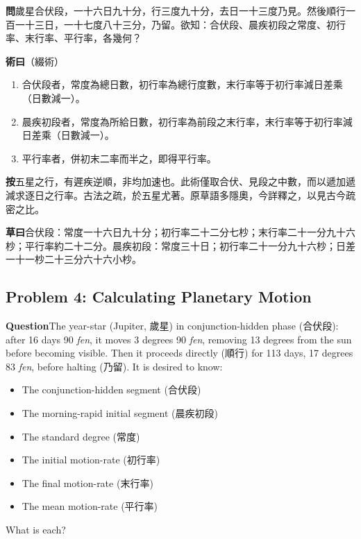 \documentclass[11pt,a4paper]{article}
\newcommand{\WenCN}{\textbf{\color{headcolor}問}}
\newcommand{\ShuCN}{\textbf{\color{headcolor}術曰}}
\newcommand{\CaoCN}{\textbf{\color{headcolor}草曰}}
\newcommand{\AnCN}{\textbf{\color{headcolor}按}}
\newcommand{\WenEN}{\textbf{\color{headcolor}Question}}
\begin{document}
\vspace{0.5em}
\WenCN{}\quad 歲星合伏段，一十六日九十分，行三度九十分，去日一十三度乃見。然後順行一百一十三日，一十七度八十三分，乃留。欲知：合伏段、晨疾初段之常度、初行率、末行率、平行率，各幾何？

\vspace{0.5em}
\ShuCN{}\quad（綴術）
\begin{enumerate}[noitemsep,topsep=0pt]
  \item 合伏段者，常度為總日數，初行率為總行度數，末行率等于初行率減日差乘（日數減一）。
  \item 晨疾初段者，常度為所給日數，初行率為前段之末行率，末行率等于初行率減日差乘（日數減一）。
  \item 平行率者，併初末二率而半之，即得平行率。
\end{enumerate}

\vspace{0.5em}
\AnCN{}\quad 五星之行，有遲疾逆順，非均加速也。此術僅取合伏、見段之中數，而以遞加遞減求逐日之行率。古法之疏，於五星尤著。原草語多隱奧，今詳釋之，以見古今疏密之比。

\vspace{0.5em}
\CaoCN{}\quad 合伏段：常度一十六日九十分；初行率二十二分七杪；末行率二十一分九十六杪；平行率約二十二分。晨疾初段：常度三十日；初行率二十一分九十六杪；日差一十一杪二十三分六十六小杪。

\switchcolumn[1]
\subsection*{Problem 4: Calculating Planetary Motion}
\label{sec:zhuishutuixing}

\vspace{0.5em}
\WenEN{}\quad The year-star (Jupiter, 歲星) in conjunction-hidden phase (合伏段): after 16 days 90 \textit{fen}, it moves 3 degrees 90 \textit{fen}, removing 13 degrees from the sun before becoming visible. Then it proceeds directly (順行) for 113 days, 17 degrees 83 \textit{fen}, before halting (乃留). It is desired to know:
\begin{itemize}[noitemsep,topsep=0pt]
  \item The conjunction-hidden segment (合伏段)
  \item The morning-rapid initial segment (晨疾初段)
  \item The standard degree (常度)
  \item The initial motion-rate (初行率)
  \item The final motion-rate (末行率)
  \item The mean motion-rate (平行率)
\end{itemize}
What is each?
\end{document}
